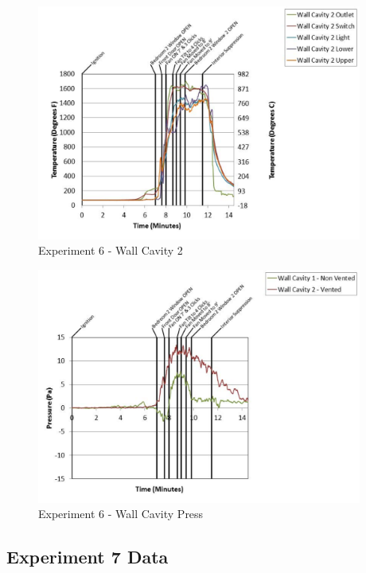 \documentclass{article}
\begin{document}
\begin{appendices}
	\clearpage

	\begin{figure}[h!]
		\centering
		\includegraphics[height=3.05in]{0_Images/Results_Charts/Exp_6_Charts/WallCavity2.pdf}
		\caption{Experiment 6 - Wall Cavity 2}
	\end{figure}
 

	\begin{figure}[h!]
		\centering
		\includegraphics[height=3.05in]{0_Images/Results_Charts/Exp_6_Charts/WallCavityPress.pdf}
		\caption{Experiment 6 - Wall Cavity Press}
	\end{figure}
 
	\clearpage

		\clearpage
\clearpage		\large
\subsection{Experiment 7 Data} \label{App:Exp7Results} 


\end{appendices}
\end{document}
